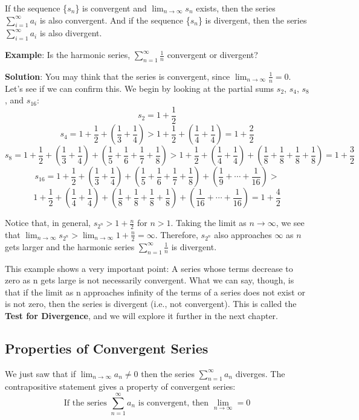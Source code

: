 If the sequence \{$s_n$\} is convergent and $\lim_{n \to \infty} s_n$ 
exists, then the series $\sum_{i=1}^\infty a_i$ is also convergent. 
And if the sequence \{$s_n$\} is divergent, then the series 
$\sum_{i=1}^\infty a_i$ is also divergent.

\textbf{Example}: Is the harmonic series, $\sum_{n = 1}^\infty \frac{1}{n}$ 
convergent or divergent?

\textbf{Solution}: You may think that the series is convergent, since $\lim_
{n \to \infty} \frac{1}{n} = 0$. Let's see if we can confirm this. We begin by 
looking at the partial sums $s_2$, $s_4$, $s_8$, and $s_{16}$:
$$s_2 = 1 + \frac{1}{2}$$
$$s_4 = 1 + \frac{1}{2} + \left(\frac{1}{3} + \frac{1}{4} \right) > 1 + 
\frac{1}{2} + \left( \frac{1}{4} + \frac{1}{4} \right) = 1 + \frac{2}{2}$$
$$s_8 = 1 + \frac{1}{2} + \left(\frac{1}{3} + \frac{1}{4} \right) + \left( 
\frac{1}{5} + \frac{1}{6} + \frac{1}{7} + \frac{1}{8} \right) > 1 + \frac{1}{2} 
+ \left(\frac{1}{4} + \frac{1}{4} \right) + \left( \frac{1}{8} + \frac{1}{8} + 
\frac{1}{8} + \frac{1}{8} \right) = 1 + \frac{3}{2}$$
$$s_{16} = 1 + \frac{1}{2} + \left(\frac{1}{3} + \frac{1}{4} \right) + \left( 
\frac{1}{5} + \frac{1}{6} + \frac{1}{7} + \frac{1}{8} \right) + \left(
\frac{1}{9} + \cdots + \frac{1}{16} \right) > $$
$$1 + \frac{1}{2} + \left(\frac{1}{4} + \frac{1}{4} \right) + \left( 
\frac{1}{8} + \frac{1}{8} + \frac{1}{8} + \frac{1}{8} \right) + \left(
\frac{1}{16} + \cdots + \frac{1}{16} \right) = 1 + \frac{4}{2}$$

Notice that, in general, $s_{2^n} > 1 + \frac{n}{2}$ for $n > 1$. Taking the 
limit as $n \to \infty$, we see that $\lim_{n \to \infty} s_{2^n} > \lim_{n 
\to \infty} 1 + \frac{n}{2} = \infty$. Therefore, $s_{2^n}$ also approaches 
$\infty$ as $n$ gets larger and the harmonic series $\sum_{n = 1}^\infty 
\frac{1}{n}$ is divergent. 

This example shows a very important point: A series whose terms decrease to 
zero as n gets large is not necessarily convergent. What we can say, though, 
is that if the limit as n approaches infinity of the terms of a series does not 
exist or is not zero, then the series is divergent (i.e., not convergent). This 
is called the \textbf{Test for Divergence}, and we will explore it further in 
the next chapter. 

\subsection{Properties of Convergent Series}
We just saw that if $\lim_{n \to \infty} a_n \neq 0$ then the series $\sum_
{n=1}^\infty a_n$ diverges. The contrapositive statement gives a property of 
convergent series:
$$\text{If the series } \sum_{n=1}^\infty a_n \text{ is convergent, then } 
\lim_{n \to \infty} = 0$$

